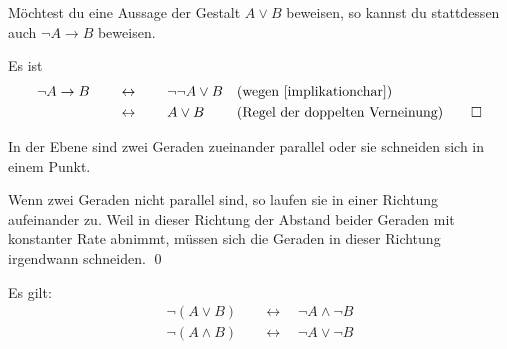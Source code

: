 \begin{satz}[*] \label{oderperimplikation}
    Möchtest du eine Aussage der Gestalt $A\lor B$ beweisen, so kannst du stattdessen auch $\neg A\to B$ beweisen.
\end{satz}


\begin{bew}
    Es ist
    \begin{align*}
        \neg A\to B \qquad &\leftrightarrow\qquad \neg\neg A\lor B && (\text{wegen \cref{implikationchar}})\\
        & \leftrightarrow\qquad A\lor B && (\text{Regel der doppelten Verneinung}) \qed
    \end{align*}
\end{bew}


\begin{bsp}[*]
    In der Ebene sind zwei Geraden zueinander parallel oder sie schneiden sich in einem Punkt.
\end{bsp}


\begin{bew}
    Wenn zwei Geraden nicht parallel sind, so laufen sie in einer Richtung aufeinander zu. Weil in dieser Richtung der Abstand beider Geraden mit konstanter Rate abnimmt, müssen sich die Geraden in dieser Richtung irgendwann schneiden. \qed
\end{bew}


\begin{satz} \label{demorgan} 
Es gilt:
    \begin{align*}
        \neg (A\lor B) \quad& \leftrightarrow\quad \neg A\land \neg B \\
        \neg(A\land B) \quad& \leftrightarrow\quad \neg A\lor \neg B
    \end{align*}
\end{satz}


